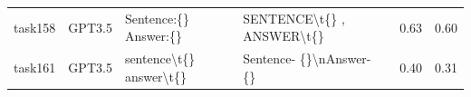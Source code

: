 \begin{longtable}{@{}p{0.8cm\tiny}p{1cm\tiny}p{4.1cm\ttfamily\tiny}p{4.1cm\ttfamily\tiny}p{0.8cm\tiny}p{0.8cm\tiny}@{}}
task158   & GPT3.5    & Sentence:\{\}  Answer:\{\}                                                                                                                                                                                                                                                                                                                                                                                                                                                                                              & SENTENCE\textbackslash{}t\{\} ,  ANSWER\textbackslash{}t\{\}                                                                                                                                                                                                                                                                                                                                                                                                                                                                                                                      & 0.63 & 0.60 \\
task161   & GPT3.5    & sentence\textbackslash{}t\{\}  answer\textbackslash{}t\{\}                                                                                                                                                                                                                                                                                                                                                                                                                                                              & Sentence- \{\}\textbackslash{}nAnswer- \{\}                                                                                                                                                                                                                                                                                                                                                                                                                                                                                                                                       & 0.40 & 0.31 \\

\end{longtable}
